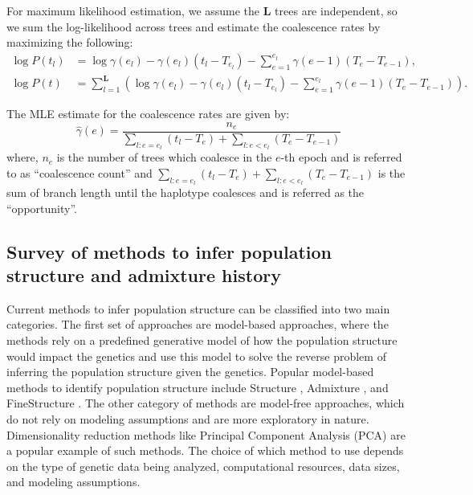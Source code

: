 For maximum likelihood estimation, we assume the $\mathbf{L}$ trees are independent, so we sum the log-likelihood across trees and estimate the coalescence rates by maximizing the following:
\begin{align}
    \log P(t_l) &= \log \gamma(e_l) - \gamma(e_l) (t_l - T_{e_l}) - \sum_{e=1}^{e_l} \gamma(e - 1) (T_{e} - T_{e-1}), \nonumber \\
    \log P(t) &= \sum_{l=1}^{\mathbf{L}} \left( \log \gamma(e_l) - \gamma(e_l) (t_l - T_{e_l}) - \sum_{e=1}^{e_l} \gamma(e - 1) (T_{e} - T_{e-1}) \right).
\end{align}

The MLE estimate for the coalescence rates are given by: 
\begin{equation}
    \hat{\gamma}(e) = \frac{n_e}{\sum_{l:e=e_l} (t_l - T_e) +  \sum_{l:e<e_l} (T_e - T_{e-1})}
\label{eq:gb_pairwise_gamma}
\end{equation}
where, $n_e$ is the number of trees which coalesce in the $e$-th epoch and is referred to as ``coalescence count'' and $\sum_{l:e=e_l} (t_l - T_e) +  \sum_{l:e<e_l} (T_e - T_{e-1})$ is the sum of branch length until the haplotype coalesces and is referred as the ``opportunity''. 

\subsection{Survey of methods to infer population structure and admixture history}
\label{sec:ch1-gb-survey}
Current methods to infer population structure can be classified into two main categories. The first set of approaches are model-based approaches, where the methods rely on a predefined generative model of how the population structure would impact the genetics and use this model to solve the reverse problem of inferring the population structure given the genetics. Popular model-based methods to identify population structure include Structure \cite{Pritchard2000}, Admixture \cite{Alexander2009}, and FineStructure \cite{Lawson2012}. The other category of methods are model-free approaches, which do not rely on modeling assumptions and are more exploratory in nature. Dimensionality reduction methods like Principal Component Analysis (PCA) are a popular example of such methods. The choice of which method to use depends on the type of genetic data being analyzed, computational resources, data sizes, and modeling assumptions.


